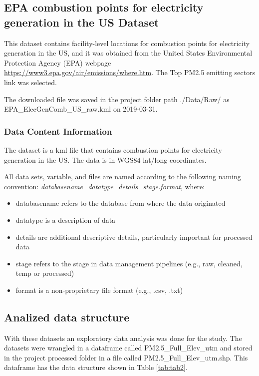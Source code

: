 \documentclass[12pt,]{article}
\begin{document}
\subsection{EPA combustion points for electricity generation in the US
Dataset}\label{epa-combustion-points-for-electricity-generation-in-the-us-dataset}

This dataset contains facility-level locations for combustion points for
electricity generation in the US, and it was obtained from the United
States Environmental Protection Agency (EPA) webpage
\url{https://www3.epa.gov/air/emissions/where.htm}. The Top PM2.5
emitting sectors link was selected.

The downloaded file was saved in the project folder path ./Data/Raw/ as
EPA\_ElecGenComb\_US\_raw.kml on 2019-03-31.

\subsubsection{Data Content
Information}\label{data-content-information-4}

The dataset is a kml file that contains combustion points for
electricity generation in the US. The data is in WGS84 lat/long
coordinates.

All data sets, variable, and files are named according to the following
naming convention: \emph{databasename\_datatype\_details\_stage.format},
where:

\begin{itemize}
\item
  databasename refers to the database from where the data originated
\item
  datatype is a description of data
\item
  details are additional descriptive details, particularly important for
  processed data
\item
  stage refers to the stage in data management pipelines (e.g., raw,
  cleaned, temp or processed)
\item
  format is a non-proprietary file format (e.g., .csv, .txt)
\end{itemize}

\subsection{Analized data structure}\label{analized-data-structure}

With these datasets an exploratory data analysis was done for the study.
The datasets were wrangled in a dataframe called PM2.5\_Full\_Elev\_utm
and stored in the project processed folder in a file called
PM2.5\_Full\_Elev\_utm.shp. This dataframe has the data structure shown
in Table \ref{tab:tab2}.
\end{document}
